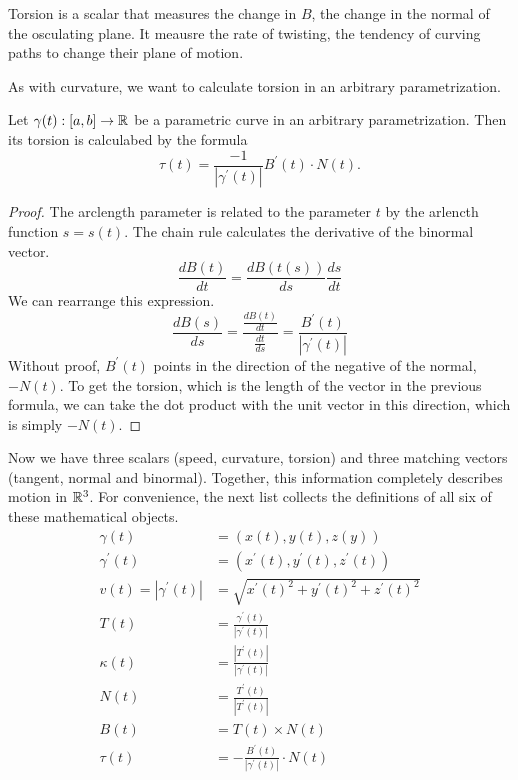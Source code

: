 \documentclass[fleqn,letterpaper]{report}
\begin{document}
Torsion is a scalar that measures the change in $B$, the change
in the normal of the osculating plane. It meausre the rate of
twisting, the tendency of curving paths to change their plane
of motion.

As with curvature, we want to calculate torsion in an
arbitrary parametrization.

\begin{prop}
Let $\gamma(t): [a,b] \rightarrow \mathbb{R}$ be a parametric curve in
an arbitrary parametrization. Then its torsion is calculabed
by the formula
\begin{equation*}
\tau(t) = \frac{-1}{|\gamma^\prime(t)|} B^\prime(t) \cdot
N(t).
\end{equation*}
\end{prop}

\begin{proof}
The arclength parameter is related to the parameter $t$ by the
arlencth function $s = s(t)$. The chain rule calculates the
derivative of the binormal vector.
\begin{equation*}
\frac{dB(t)}{dt} = \frac{dB(t(s))}{ds} \frac{ds}{dt} 
\end{equation*}
We can rearrange this expression.
\begin{equation*}
\frac{dB(s)}{ds} = \frac{\frac{dB(t)}{dt}}{\frac{dt}{ds}}
= \frac{B^\prime(t)}{|\gamma^\prime(t)|}
\end{equation*}
Without proof, $B^\prime(t)$ points in the direction of the
negative of the normal, $-N(t)$. To get the torsion, which is
the length of the vector in the previous formula, we can take
the dot product with the unit vector in this direction, which
is simply $-N(t)$.
\end{proof}

Now we have three scalars (speed, curvature, torsion) and
three matching vectors (tangent, normal and binormal).
Together, this information completely describes motion in
$\mathbb{R}^3$. For convenience, the next list collects the
definitions of all six of these mathematical objects.
\begin{align*}
\gamma(t) & = (x(t), y(t), z(y))\\
\gamma^\prime(t) & = (x^\prime(t), y^\prime(t), z^\prime(t))\\
v(t) = |\gamma^\prime(t)| & = \sqrt{x^\prime(t)^2 + y^\prime(t)^2
+ z^\prime(t)^2 } \\
T(t) & = \frac{\gamma^\prime(t)}{|\gamma^\prime(t)|} \\
\kappa(t) & = \frac{|T^\prime(t)|}{|\gamma^\prime(t)|} \\
N(t) & = \frac{ T^\prime(t)}{|T^\prime(t)|} \\
B(t) & = T(t) \times N(t) \\
\tau(t) & = - \frac{B^\prime(t)}{|\gamma^\prime(t)|} \cdot N(t)
\end{align*}
\end{document}
